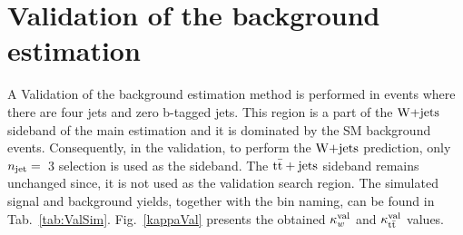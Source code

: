 \section{Validation of the background estimation}
\label{sec:Val}
A Validation of the background estimation method is performed in events where there are four jets and zero b-tagged jets.
This region is a part of the $\textrm{W+jets}$ sideband of the main estimation and it is dominated by the SM background events. Consequently, in the validation, to perform the $\textrm{W+jets}$ prediction, only $n_{\rm jet}=$~3 selection is used as the sideband. The ${\rm t\bar{t}+jets}$ sideband remains unchanged since, it is not used as the validation search region. The simulated signal and background yields, together with the bin naming, can be found in Tab.~\ref{tab:ValSim}. Fig.~\ref{kappaVal} presents the obtained $\kappa_w^{\rm val}$ and $\kappa_{\rm t\bar{t}}^{\rm val}$ values.
\begin{table}[ht]\begin{center}
\caption{Simulation table of the validation regions, 35.9~fb$^{-1}$}\label{tab:ValSim}
\end{center}\end{table}
